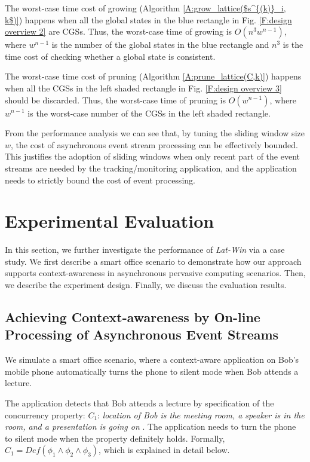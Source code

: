 \documentclass[12pt,journal,letterpaper,compsoc]{IEEEtran}
\begin{document}
The worst-case time cost of growing (Algorithm \ref{A:grow_lattice($s^{(k)}_i, k$)}) happens when all the global states in the blue rectangle in Fig. \ref{F:design overview 2} are CGSs. Thus, the worst-case time of growing is $O(n^3w^{n-1})$, where $w^{n-1}$ is the number of the global states in the blue rectangle and $n^3$ is the time cost of checking whether a global state is consistent.

The worst-case time cost of pruning (Algorithm \ref{A:prune_lattice(C,k)}) happens when all the CGSs in the left shaded rectangle in Fig. \ref{F:design overview 3} should be discarded. Thus, the worst-case time of pruning is $O(w^{n-1})$, where $w^{n-1}$ is the worst-case number of the CGSs in the left shaded rectangle.

From the performance analysis we can see that, by tuning the sliding window size $w$, the cost of asynchronous event stream processing can be effectively bounded. This justifies the adoption of sliding windows when only recent part of the event streams are needed by the tracking/monitoring application, and the application needs to strictly bound the cost of event processing.

\section{Experimental Evaluation}
\label{sec:evaluation}

In this section, we further investigate the performance of {\it Lat-Win} via a case study. We first describe a smart office scenario to demonstrate how our approach supports context-awareness in asynchronous pervasive computing scenarios. Then, we describe the experiment design. Finally, we discuss the evaluation results.

\subsection{Achieving Context-awareness by On-line Processing of Asynchronous Event Streams}

We simulate a smart office scenario, where a context-aware application on Bob's mobile phone automatically turns the phone to silent mode when Bob attends a lecture\cite{Huang11}.

The application detects that Bob attends a lecture by specification of the concurrency property: $C_{1}$: {\it location of Bob is the meeting room, a speaker is in the room, and a presentation is going on} \cite{Huang11}. The application needs to turn the phone to silent mode when the property definitely holds. Formally, $C_{1} = Def(\phi_{1}\wedge\phi_{2}\wedge\phi_{3})$, which is explained in detail below.
\end{document}
